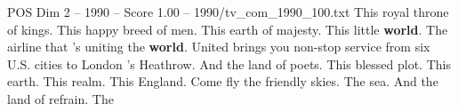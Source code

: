 \begin{textsample}{POS Dim 2 – 1990 – Score 1.00 – 1990/tv\_com\_1990\_100.txt}  \label{ex:f2_pos_034}
This royal throne of kings.
This happy breed of men.
This earth of majesty.
This little \textbf{world}.
The airline that 's uniting the \textbf{world}.
United brings you non-stop service from six U.S. cities to London 's Heathrow.
And the land of poets.
This blessed plot.
This earth.
This realm.
This England.
Come fly the friendly skies.
The sea.
And the land of refrain.
The

\end{textsample}
